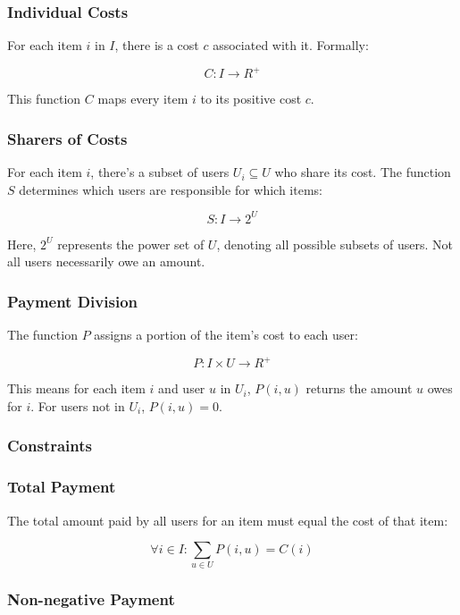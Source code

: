 \documentclass[12pt]{article}
\begin{document}
\subsubsection*{Individual Costs}

For each item $i$ in $I$, there is a cost $c$ associated with it. Formally:

\[
C: I \rightarrow R^+
\]

This function $C$ maps every item $i$ to its positive cost $c$.

\subsubsection*{Sharers of Costs}

For each item $i$, there's a subset of users $U_i \subseteq U$ who share its cost. The function $S$ determines which users are responsible for which items:

\[
S: I \rightarrow 2^U
\]

Here, $2^U$ represents the power set of $U$, denoting all possible subsets of users. Not all users necessarily owe an amount.

\subsubsection*{Payment Division}

The function $P$ assigns a portion of the item's cost to each user:

\[
P: I \times U \rightarrow R^+
\]

This means for each item $i$ and user $u$ in $U_i$, $P(i, u)$ returns the amount $u$ owes for $i$. For users not in $U_i$, $P(i, u) = 0$.

\subsubsection*{Constraints}

\subsubsection*{Total Payment}

The total amount paid by all users for an item must equal the cost of that item:

\[
\forall i \in I: \sum_{u \in U} P(i, u) = C(i)
\]

\subsubsection*{Non-negative Payment}
\end{document}
